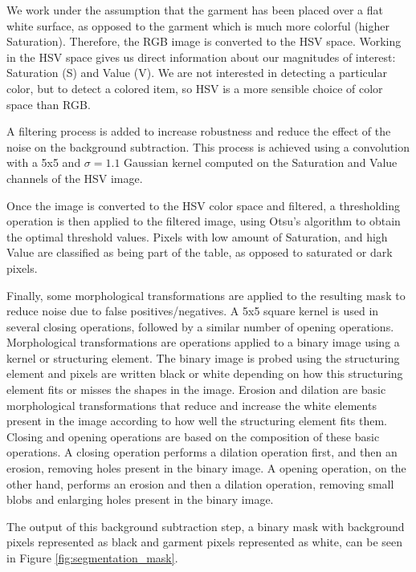 We work under the assumption that the garment has been placed over a flat white surface, as opposed to the garment which is much more colorful (higher Saturation). Therefore, the RGB image is converted to the HSV space. Working in the HSV space gives us direct information about our magnitudes of interest: Saturation (S) and Value (V). We are not interested in detecting a particular color, but to detect a colored item, so HSV is a more sensible choice of color space than RGB. 

A filtering process is added to increase robustness and reduce the effect of the noise on the background subtraction. This process is achieved using a convolution with a 5x5 and $\sigma=1.1$ Gaussian kernel computed on the Saturation and Value channels of the HSV image.

Once the image is converted to the HSV color space and filtered, a thresholding operation is then applied to the filtered image, using Otsu's algorithm \cite{otsu1975threshold} to obtain the optimal threshold values. Pixels with low amount of Saturation, and high Value are classified as being part of the table, as opposed to saturated or dark pixels.

Finally, some morphological transformations are applied to the resulting mask to reduce noise due to false positives/negatives. A 5x5 square kernel is used in several closing operations, followed by a similar number of opening operations. Morphological transformations are operations applied to a binary image using a kernel or structuring element. The binary image is probed using the structuring element and pixels are written black or white depending on how this structuring element fits or misses the shapes in the image. Erosion and dilation are basic morphological transformations that reduce and increase the white elements present in the image according to how well the structuring element fits them. Closing and opening operations are based on the composition of these basic operations. A closing operation performs a dilation operation first, and then an erosion, removing holes present in the binary image. A opening operation, on the other hand, performs an erosion and then a dilation operation, removing small blobs and enlarging holes present in the binary image.

The output of this background subtraction step, a binary mask with background pixels represented as black and garment pixels represented as white, can be seen in Figure \ref{fig:segmentation_mask}.

